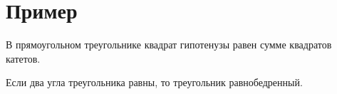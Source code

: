 \documentclass[12pt]{article}
\begin{document}
\section*{Пример}
\begin{theorem}
В прямоугольном треугольнике квадрат гипотенузы равен сумме квадратов катетов.
\end{theorem}

\begin{lemma}
Если два угла треугольника равны, то треугольник равнобедренный.
\end{lemma}
\end{document}
